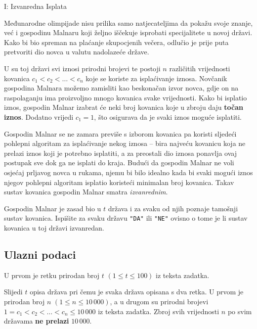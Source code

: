 \begin{statement}[
  timelimit=1 s,
  memorylimit=512 MiB,
]{I: Izvanredna Isplata}

Međunarodne olimpijade nisu prilika samo natjecateljima da pokažu svoje znanje,
već i gospodinu Malnaru koji željno iščekuje isprobati specijalitete u novoj
državi. Kako bi bio spreman na plaćanje skupocjenih večera, odlučio je prije
puta pretvoriti dio novca u valutu nadolazeće države.

U su toj državi svi iznosi prirodni brojevi te postoji $n$ različitih
vrijednosti kovanica $c_1 < c_2 < \dots < c_n$ koje se koriste za
isplaćivanje iznosa. Novčanik gospodina Malnara možemo zamisliti kao
beskonačan izvor novca, gdje on na raspolaganju ima proizvoljno mnogo
kovanica svake vrijednosti. Kako bi isplatio iznos, gospodin Malnar izabrat
će neki broj kovanica koje u zbroju daju \textbf{točan iznos}. Dodatno
vrijedi $c_1 = 1$, što osigurava da je svaki iznos moguće isplatiti.

Gospodin Malnar se ne zamara previše s izborom kovanica pa koristi sljedeći
pohlepni algoritam za isplaćivanje nekog iznosa -- bira najveću kovanicu koja
ne prelazi iznos koji je potrebno isplatiti, a za preostali dio iznosa
ponavlja ovaj postupak sve dok ga ne isplati do kraja. Budući da gospodin
Malnar ne voli osjećaj prljavog novca u rukama, njemu bi bilo idealno kada bi
svaki mogući iznos njegov pohlepni algoritam isplatio koristeći minimalan
broj kovanica. Takav sustav kovanica gospodin Malnar smatra
\textit{izvanrednim}.

Gospodin Malnar je zasad bio u $t$ država i za svaku od njih poznaje tamošnji
sustav kovanica. Ispišite za svaku državu \texttt{"DA"} ili \texttt{"NE"}
ovisno o tome je li sustav kovanica u toj državi izvanredan.

\subsection*{Ulazni podaci}
U prvom je retku prirodan broj $t$ $(1 \le t \le 100)$ iz teksta zadatka.

Slijedi $t$ opisa država pri čemu je svaka država opisana s dva retka. U prvom
je prirodan broj $n$ $(1 \le n \le 10\,000)$, a u drugom su
prirodni brojevi $1 = c_1 < c_2 < \dots < c_n \le 10\,000$ iz teksta zadatka.
Zbroj svih vrijednosti $n$ po svim državama \textbf{ne prelazi} $10\,000$.


\end{statement}
